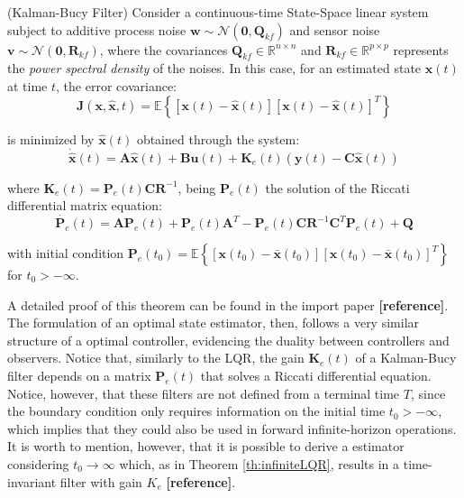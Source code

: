 \documentclass[a4paper,11pt]{book}
\numberwithin{figure}{chapter}
\numberwithin{equation}{chapter}
\numberwithin{table}{chapter}
\newtheorem{theorem}{Theorem}[chapter]
\theoremstyle{definition}
\newcounter{boxed-theorem}
\newenvironment{boxed-theorem}[1]
{\begin{shaded} \begin{theorem}{#1}}
{\end{theorem} \end{shaded}}
\newcounter{boxed-definition}
\begin{document}
\begin{boxed-theorem}{(Kalman-Bucy Filter)} \label{th:kalmanBucy}
	Consider a continuous-time State-Space linear system subject to additive process noise $\bm{w} \sim \mathcal{N}(\bm{0}, \bm{Q}_{kf})$ and sensor noise $\bm{v} \sim \mathcal{N}(\bm{0}, \bm{R}_{kf})$, where the covariances $\bm{Q}_{kf} \in \mathbb{R}^{n \times n}$  and $\bm{R}_{kf} \in \mathbb{R}^{p \times p}$ represents the \emph{power spectral density} of the noises.	In this case, for an estimated state $\hat{\bm{x}}(t)$ at time $t$, the error covariance:
	\begin{equation}
		\bm{J}(\bm{x}, \hat{\bm{x}}, t) = \mathbb{E}\left\{ [\bm{x}(t) - \hat{\bm{x}}(t)][\bm{x}(t) - \hat{\bm{x}}(t)]^T \right\}
	\end{equation}
	
	\noindent is minimized by $\hat{\bm{x}}(t)$ obtained through the system:
	\begin{equation}
		\dot{\hat{\bm{x}}}(t) = \bm{A} \hat{\bm{x}}(t) + \bm{B} \bm{u}(t) + \bm{K}_{e}(t) \left( \bm{y}(t) - \bm{C} \hat{\bm{x}}(t) \right)
	\end{equation}
	
	\noindent where $\bm{K}_e(t) = \bm{P}_e(t)\bm{C}\bm{R}^{-1}$, being $\bm{P}_e(t)$ the solution of the Riccati differential matrix equation:
	\begin{equation}
		\dot{\bm{P}_e}(t) = \bm{A} \bm{P}_e(t) + \bm{P}_e(t) \bm{A}^T - \bm{P}_e(t)\bm{C}\bm{R}^{-1} \bm{C}^T \bm{P}_e(t) + \bm{Q}
	\end{equation}
	
	\noindent with initial condition $\bm{P}_e(t_0) = \mathbb{E} \left\{ [\bm{x}(t_0) - \bar{\bm{x}}(t_0)][\bm{x}(t_0) - \bar{\bm{x}}(t_0)]^T \right\}$ for $t_0 > -\infty$.
\end{boxed-theorem}

A detailed proof of this theorem can be found in the import paper \textbf{[reference]}. The formulation of an optimal state estimator, then, follows a very similar structure of a optimal controller, evidencing the duality between controllers and observers. Notice that, similarly to the LQR, the gain $\bm{K}_e(t)$ of a Kalman-Bucy filter depends on a matrix $\bm{P}_e(t)$ that solves a Riccati differential equation. Notice, however, that these filters are not defined from a terminal time $T$, since the boundary condition only requires information on the initial time $t_0 > -\infty$, which implies that they could also be used in forward infinite-horizon operations. It is worth to mention, however, that it is possible to derive a estimator considering $t_0 \to \infty$ which, as in Theorem \ref{th:infiniteLQR}, results in a time-invariant filter with gain $K_e$ \textbf{[reference]}.
\end{document}
